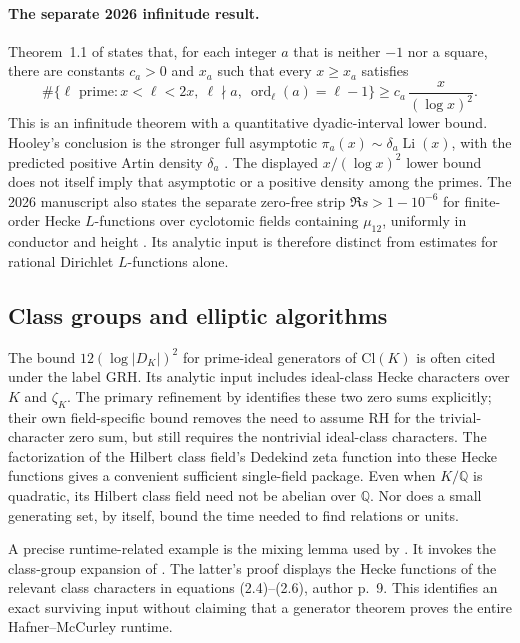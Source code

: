\documentclass[11pt]{article}
\newcommand{\Q}{\mathbb Q}
\theoremstyle{definition}
\theoremstyle{remark}
\begin{document}
\paragraph{The separate 2026 infinitude result.}
Theorem~1.1 of \citet[p.~2]{OpenAIArtin2026} states that, for each
integer \(a\) that is neither \(-1\) nor a square, there are constants
\(c_a>0\) and \(x_a\) such that every \(x\geq x_a\) satisfies
\[
 \#\{\ell\text{ prime}:x<\ell<2x,\ \ell\nmid a,\
                    \operatorname{ord}_\ell(a)=\ell-1\}
 \geq c_a\,\frac{x}{(\log x)^2}.
\]
This is an infinitude theorem with a quantitative dyadic-interval
lower bound. Hooley's conclusion is the stronger full asymptotic
\(\pi_a(x)\sim\delta_a\operatorname{Li}(x)\), with the predicted
positive Artin density \(\delta_a\)
\citep[translation p.~47]{Hooley1967}.
The displayed \(x/(\log x)^2\) lower bound does not itself imply that
asymptotic or a positive density among the primes.
The 2026 manuscript also states the separate zero-free strip
\(\Re s>1-10^{-6}\) for finite-order Hecke \(L\)-functions over
cyclotomic fields containing \(\mu_{12}\), uniformly in conductor
and height \citep[Theorem~1.2, p.~3]{OpenAIArtin2026}.
Its analytic input is therefore distinct from estimates for rational
Dirichlet \(L\)-functions alone.

\subsection{Class groups and elliptic algorithms}

The bound $12(\log|D_K|)^2$ for prime-ideal generators of
$\mathrm{Cl}(K)$ is often cited under the label GRH. Its analytic input
includes ideal-class Hecke characters over $K$ and $\zeta_K$.
The primary refinement by \citet[author pp.~2--3]{BDF2008} identifies
these two zero sums explicitly; their own field-specific bound removes
the need to assume RH for the trivial-character zero sum, but still
requires the nontrivial ideal-class characters.
The factorization of the Hilbert class field's Dedekind zeta function
into these Hecke functions gives a convenient sufficient single-field
package. Even when $K/\Q$ is quadratic, its Hilbert class field need
not be abelian over $\Q$. Nor does a small generating set, by itself,
bound the time needed to find relations or units.

A precise runtime-related example is the mixing lemma used by
\citet[Proposition~1, author pp.~8--9]{BiasseErukulangara2023}.
It invokes the class-group expansion of \citet[Corollary~1.3]{JMV2009}.
The latter's proof displays the Hecke functions of the relevant class
characters in equations (2.4)--(2.6), author p.~9. This identifies an
exact surviving input without claiming that a generator theorem proves
the entire Hafner--McCurley runtime.
\end{document}
